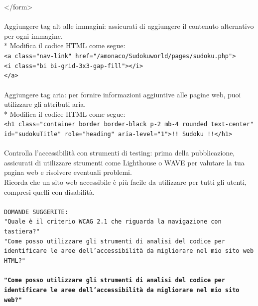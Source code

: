 \begin{adjustwidth}{1cm}{1cm}
{{    </form>}\\
\\Aggiungere tag alt alle immagini: assicurati di aggiungere il contenuto alternativo per ogni immagine.\\
*   Modifica il codice HTML come segue:\\
    \texttt{<a class="nav-link" href="/amonaco/Sudokuworld/pages/sudoku.php">\\
    \indent <i class="bi bi-grid-3x3-gap-fill"></i>\\
    </a>}\\
\\Aggiungere tag aria: per fornire informazioni aggiuntive alle pagine web, puoi utilizzare gli attributi aria.\\
*   Modifica il codice HTML come segue:\\
    \texttt{<h1 class="container border border-black p-2 mb-4 rounded text-center" id="sudokuTitle" role="heading" aria-level="1">!! Sudoku !!</h1>}\\
\\Controlla l'accessibilità con strumenti di testing: prima della pubblicazione, assicurati di utilizzare strumenti come Lighthouse o WAVE per valutare la tua pagina web e risolvere eventuali problemi.\\
Ricorda che un sito web accessibile è più facile da utilizzare per tutti gli utenti, compresi quelli con disabilità.\\
\\
\texttt{DOMANDE SUGGERITE: \\"Quale è il criterio WCAG 2.1 che riguarda la navigazione con tastiera?"
\\"Come posso utilizzare gli strumenti di analisi del codice per identificare le aree dell'accessibilità da migliorare nel mio sito web HTML?"
}}
\end{adjustwidth}

\paragraph*{\texttt{"Come posso utilizzare gli strumenti di analisi del codice per \\ identificare le aree dell'accessibilità da migliorare nel mio sito web?"}} 
\begin{adjustwidth}{1cm}{1cm}
\end{adjustwidth}

